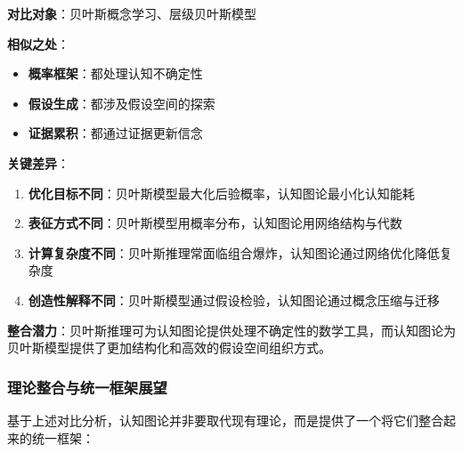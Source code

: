 \documentclass[12pt,a4paper]{article}
\begin{document}
\textbf{对比对象}：贝叶斯概念学习、层级贝叶斯模型

\textbf{相似之处}：
\begin{itemize}
\item \textbf{概率框架}：都处理认知不确定性
\item \textbf{假设生成}：都涉及假设空间的探索
\item \textbf{证据累积}：都通过证据更新信念
\end{itemize}

\textbf{关键差异}：
\begin{enumerate}
\item \textbf{优化目标不同}：贝叶斯模型最大化后验概率，认知图论最小化认知能耗
\item \textbf{表征方式不同}：贝叶斯模型用概率分布，认知图论用网络结构与代数
\item \textbf{计算复杂度不同}：贝叶斯推理常面临组合爆炸，认知图论通过网络优化降低复杂度
\item \textbf{创造性解释不同}：贝叶斯模型通过假设检验，认知图论通过概念压缩与迁移
\end{enumerate}

\textbf{整合潜力}：贝叶斯推理可为认知图论提供处理不确定性的数学工具，而认知图论为贝叶斯模型提供了更加结构化和高效的假设空间组织方式。

\subsubsection{理论整合与统一框架展望}
\label{subsubsec:integration_outlook}

基于上述对比分析，认知图论并非要取代现有理论，而是提供了一个将它们整合起来的统一框架：
\end{document}
